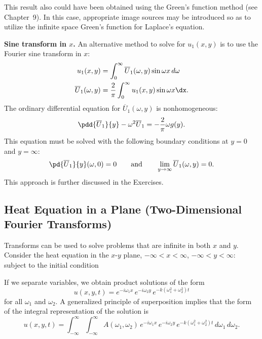 This result also could have been obtained using the Green's function method (see Chapter~9).  In this case, appropriate image sources may be introduced so as to utilize the infinite space Green's function for Laplace's equation.

\textbf{Sine transform in $x$.}  An alternative method to solve for $u_1(x,y)$ is to use the Fourier sine transform in $x$:
\begin{align*}
u_1(x,y) &= \int_0^{\infty}\overline{U}_1(\omega,y)\sin\omega x\,d\omega \\
\overline{U}_1(\omega,y) &= \frac{2}{\pi}\int_0^{\infty}u_1(x,y)\sin\omega x\dx.
\end{align*}
The ordinary differential equation for $\overline{U}_1(\omega,y)$ is nonhomogeneous:
\[
\pdd{\overline{U}_1}{y} - \omega^2\overline{U}_1 = -\frac{2}{\pi}\omega g(y).
\]
This equation must be solved with the following boundary conditions at $y = 0$ and $y = \infty$:
\[
\pd{\overline{U}_1}{y}(\omega,0) = 0 \qquad \text{and} \qquad \lim_{y\to\infty}\overline{U}_1(\omega,y) = 0.
\]
This approach is further discussed in the Exercises.

\subsection{Heat Equation in a Plane (Two-Dimensional Fourier Transforms)}
\label{subsec:heat-plane}

Transforms can be used to solve problems that are infinite in both $x$ and $y$.  Consider the heat equation in the $x$-$y$ plane, $-\infty < x < \infty$, $-\infty < y < \infty$:
subject to the initial condition

If we separate variables, we obtain product solutions of the form
\[
u(x,y,t) = e^{-i\omega_1 x}\,e^{-i\omega_2 y}\,e^{-k(\omega_1^2+\omega_2^2)t}
\]
for all $\omega_1$ and $\omega_2$.  A generalized principle of superposition implies that the form of the integral representation of the solution is
\begin{equation}
\label{eq:heat2d-sol-sep}
u(x,y,t) = \int_{-\infty}^{\infty}\int_{-\infty}^{\infty}A(\omega_1,\omega_2)\,e^{-i\omega_1 x}\,e^{-i\omega_2 y}\,e^{-k(\omega_1^2+\omega_2^2)t}\,d\omega_1\,d\omega_2.
\end{equation}

